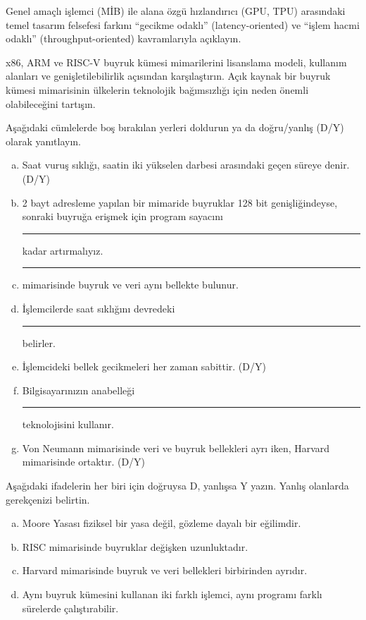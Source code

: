 \begin{alistirma}[\orta]
Genel amaçlı işlemci (MİB) ile alana özgü hızlandırıcı (GPU, TPU) arasındaki temel tasarım felsefesi farkını ``gecikme odaklı'' (latency-oriented) ve ``işlem hacmi odaklı'' (throughput-oriented) kavramlarıyla açıklayın.
\end{alistirma}

\begin{alistirma}[\zor]
x86, ARM ve RISC-V buyruk kümesi mimarilerini lisanslama modeli, kullanım alanları ve genişletilebilirlik açısından karşılaştırın. Açık kaynak bir buyruk kümesi mimarisinin ülkelerin teknolojik bağımsızlığı için neden önemli olabileceğini tartışın.
\end{alistirma}


\begin{alistirma}[\kolay]
Aşağıdaki cümlelerde boş bırakılan yerleri doldurun ya da doğru/yanlış (D/Y) olarak yanıtlayın.
\begin{enumerate}[(a)]
    \item Saat vuruş sıklığı, saatin iki yükselen darbesi arasındaki geçen süreye denir. (D/Y)
    \item 2 bayt adresleme yapılan bir mimaride buyruklar 128 bit genişliğindeyse, sonraki buyruğa erişmek için program sayacını \rule{2cm}{0.4pt} kadar artırmalıyız.
    \item \rule{3cm}{0.4pt} mimarisinde buyruk ve veri aynı bellekte bulunur.
    \item İşlemcilerde saat sıklığını devredeki \rule{3cm}{0.4pt} belirler.
    \item İşlemcideki bellek gecikmeleri her zaman sabittir. (D/Y)
    \item Bilgisayarınızın anabelleği \rule{2cm}{0.4pt} teknolojisini kullanır.
    \item Von Neumann mimarisinde veri ve buyruk bellekleri ayrı iken, Harvard mimarisinde ortaktır. (D/Y)
\end{enumerate}
\end{alistirma}

\begin{alistirma}[\orta]
Aşağıdaki ifadelerin her biri için doğruysa D, yanlışsa Y yazın. Yanlış olanlarda gerekçenizi belirtin.
\begin{enumerate}[(a)]
    \item Moore Yasası fiziksel bir yasa değil, gözleme dayalı bir eğilimdir.
    \item RISC mimarisinde buyruklar değişken uzunluktadır.
    \item Harvard mimarisinde buyruk ve veri bellekleri birbirinden ayrıdır.
    \item Aynı buyruk kümesini kullanan iki farklı işlemci, aynı programı farklı sürelerde çalıştırabilir.
\end{enumerate}
\end{alistirma}

